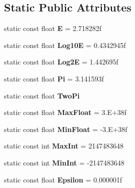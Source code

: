 \subsection*{Static Public Attributes}
\begin{DoxyCompactItemize}
\item 
\hypertarget{classMath_af648460e9df0272cc721d00b31181e75}{}static const float {\bfseries E} = 2.\+718282f\label{classMath_af648460e9df0272cc721d00b31181e75}

\item 
\hypertarget{classMath_a07e4ce5c7bcec873c3d4671c9aed11a8}{}static const float {\bfseries Log10\+E} = 0.\+4342945f\label{classMath_a07e4ce5c7bcec873c3d4671c9aed11a8}

\item 
\hypertarget{classMath_a0212609a0369ceeb04b9a64b228b76fc}{}static const float {\bfseries Log2\+E} = 1.\+442695f\label{classMath_a0212609a0369ceeb04b9a64b228b76fc}

\item 
\hypertarget{classMath_abc2f17b5e6cb4da17f718364aedafa8e}{}static const float {\bfseries Pi} = 3.\+141593f\label{classMath_abc2f17b5e6cb4da17f718364aedafa8e}

\item 
\hypertarget{classMath_a81d1e8c9e6150ed218f0d01b68dfdbcd}{}static const float {\bfseries Two\+Pi}\label{classMath_a81d1e8c9e6150ed218f0d01b68dfdbcd}

\item 
\hypertarget{classMath_a2835e5027d6e945147b6ad7d532cdd58}{}static const float {\bfseries Max\+Float} = 3.\+E+38f\label{classMath_a2835e5027d6e945147b6ad7d532cdd58}

\item 
\hypertarget{classMath_aa72ba3b8a773f863f4437cc3c7c973d5}{}static const float {\bfseries Min\+Float} = -\/3.\+E+38f\label{classMath_aa72ba3b8a773f863f4437cc3c7c973d5}

\item 
\hypertarget{classMath_a7c0c0c1e493031bf06586b726a27be4e}{}static const int {\bfseries Max\+Int} = 2147483648\label{classMath_a7c0c0c1e493031bf06586b726a27be4e}

\item 
\hypertarget{classMath_a89d6f8e36b555b6687f69c12fdb68120}{}static const int {\bfseries Min\+Int} = -\/2147483648\label{classMath_a89d6f8e36b555b6687f69c12fdb68120}

\item 
\hypertarget{classMath_a3ed97c5d5004d8f35fa4eb2a80b9c2a2}{}static const float {\bfseries Epsilon} = 0.\+000001f\label{classMath_a3ed97c5d5004d8f35fa4eb2a80b9c2a2}

\end{DoxyCompactItemize}


